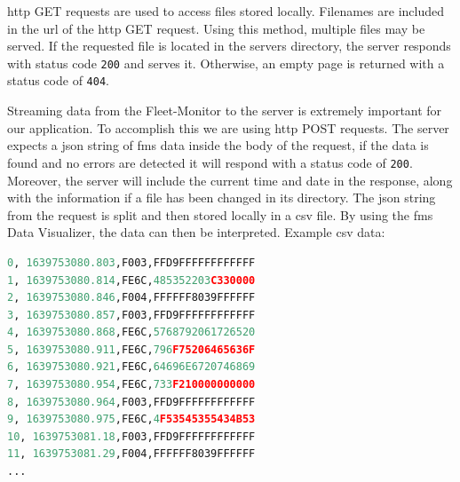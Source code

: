 \acrshort{http} GET requests are used to access files stored locally. Filenames are included in the \acrshort{url} of the \acrshort{http} GET request. Using this method, multiple files may be served. If the requested file is located in the servers directory, the server responds with status code \texttt{200} and serves it. Otherwise, an empty page is returned with a status code of \texttt{404}.

Streaming data from the Fleet-Monitor to the server is extremely important for our application. To accomplish this we are using \acrshort{http} POST requests. The server expects a \acrshort{json} string of \acrshort{fms} data inside the body of the request, if the data is found and no errors are detected it will respond with a status code of \texttt{200}. Moreover, the server will include the current time and date in the response, along with the information if a file has been changed in its directory. The \acrshort{json} string from the request is split and then stored locally in a \acrshort{csv} file. By using the \acrshort{fms} Data Visualizer, the data can then be interpreted. Example \acrshort{csv} data:

\bigskip
{}
\begin{lstlisting}[backgroundcolor=\color{gray!10},  
                   basicstyle=\ttfamily,
                   columns=fullflexible,
                   breakatwhitespace=false,      
                   breaklines=true,                
                   captionpos=b,                    
                   commentstyle=\color{mygreen}, 
                   extendedchars=true,              
                   frame=single,                   
                   keepspaces=true,             
                   keywordstyle=\color{blue},      
                   language=Python,                 
                   numbers=none,                
                   numbersep=5pt,                   
                   numberstyle=\color{blue}, 
                   rulecolor=\color{mygray},        
                   showspaces=false,
                   showstringspaces=false,
                   showtabs=false,                 
                   stepnumber=5,                  
                   stringstyle=\color{mymauve},    
                   tabsize=2,                      
                   title=\lstname,
                   frame=none,
                   xleftmargin = 1cm,
                   framexleftmargin = 1em]
0, 1639753080.803,F003,FFD9FFFFFFFFFFFF
1, 1639753080.814,FE6C,485352203C330000
2, 1639753080.846,F004,FFFFFF8039FFFFFF
3, 1639753080.857,F003,FFD9FFFFFFFFFFFF
4, 1639753080.868,FE6C,5768792061726520 
5, 1639753080.911,FE6C,796F75206465636F 
6, 1639753080.921,FE6C,64696E6720746869
7, 1639753080.954,FE6C,733F210000000000
8, 1639753080.964,F003,FFD9FFFFFFFFFFFF
9, 1639753080.975,FE6C,4F53545355434B53
10, 1639753081.18,F003,FFD9FFFFFFFFFFFF
11, 1639753081.29,F004,FFFFFF8039FFFFFF
...

\end{lstlisting}

